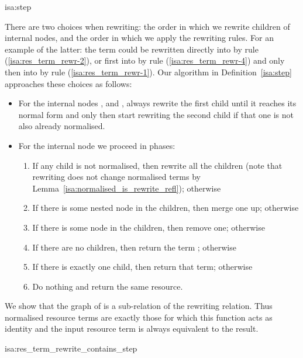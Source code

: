 \documentclass[class=smolathesis,crop=false]{standalone}
\begin{document}
\begin{isadef}{isa:step}
  
\end{isadef}

There are two choices when rewriting: the order in which we rewrite children of internal nodes, and the order in which we apply the rewriting rules.
For an example of the latter: the term  could be rewritten directly into  by rule (\ref{isa:res_term_rewr-2}), or first into  by rule (\ref{isa:res_term_rewr-4}) and only then into  by rule (\ref{isa:res_term_rewr-1}).
Our algorithm in Definition~\ref{isa:step} approaches these choices as follows:
\begin{itemize}
  \item For the internal nodes ,  and , always rewrite the first child until it reaches its normal form and only then start rewriting the second child if that one is not also already normalised.
  \item For the internal node  we proceed in phases:
    \begin{enumerate}[label=\roman*.]
      \item If any child is not normalised, then rewrite all the children (note that rewriting does not change normalised terms by Lemma~\ref{isa:normalised_is_rewrite_refl}); otherwise
      \item If there is some nested  node in the children, then merge one up; otherwise
      \item If there is some  node in the children, then remove one; otherwise
      \item If there are no children, then return the term ; otherwise
      \item If there is exactly one child, then return that term; otherwise
      \item Do nothing and return the same resource.
    \end{enumerate}
\end{itemize}

We show that the graph of  is a sub-relation of the rewriting relation.
Thus normalised resource terms are exactly those for which this function acts as identity and the input resource term is always equivalent to the result.
\begin{isalemma}{isa:res_term_rewrite_contains_step}
  
\end{isalemma}
\end{document}
